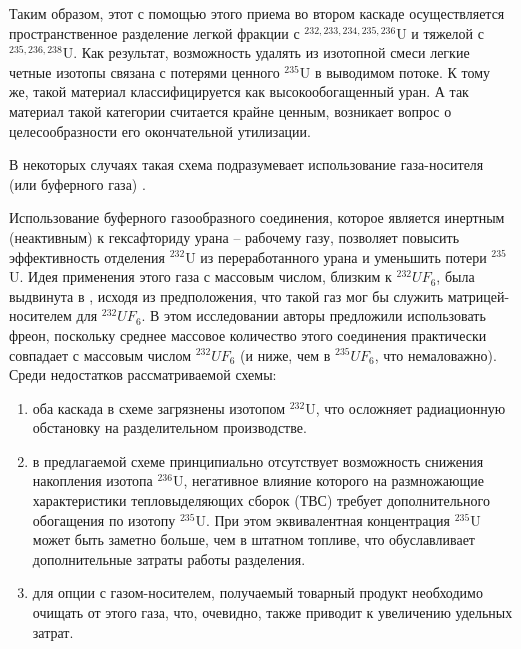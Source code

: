 Таким образом, этот с помощью этого приема во втором каскаде осуществляется пространственное разделение легкой фракции с $^{232,233,234,235,236}$U и тяжелой с $^{235,236,238}$U.
Как результат, возможность удалять из изотопной смеси легкие четные изотопы связана с потерями ценного $^{235}$U в выводимом потоке.
К тому же, такой материал классифицируется как высокообогащенный уран. А так материал такой категории считается крайне ценным, возникает вопрос о целесообразности его окончательной утилизации. 

В некоторых случаях такая схема подразумевает использование газа-носителя (или буферного газа) \cite{prusakovCorrectingIsotopicComposition2008, SposobIzotopnogoVosstanovleniyab}.


Использование буферного газообразного соединения, которое является инертным (неактивным) к гексафториду урана -- рабочему газу, позволяет повысить эффективность отделения $^{232}$U из переработанного урана и уменьшить потери $^{235}$U. Идея применения этого газа с массовым числом, близким к $^{232}UF_6$, была выдвинута в \cite{SosninYuChelcov}, исходя из предположения, что такой газ мог бы служить матрицей-носителем для $^{232}UF_6$. В этом исследовании авторы предложили использовать фреон, поскольку среднее массовое количество этого соединения практически совпадает с массовым числом $^{232}UF_6$ (и ниже, чем в $^{235}UF_6$, что немаловажно).
Среди недостатков рассматриваемой схемы:
\begin{enumerate}
  \item оба каскада в схеме загрязнены изотопом $^{232}$U, что осложняет радиационную обстановку на разделительном производстве.
  \item в предлагаемой схеме принципиально отсутствует возможность снижения накопления изотопа $^{236}$U, негативное влияние которого на размножающие характеристики тепловыделяющих сборок (ТВС) требует дополнительного обогащения по изотопу $^{235}$U. При этом эквивалентная концентрация $^{235}$U может быть заметно больше, чем в штатном топливе, что обуславливает дополнительные затраты работы разделения.
  \item для опции с газом-носителем, получаемый товарный продукт необходимо очищать от этого газа, что, очевидно, также приводит к увеличению удельных затрат.
\end{enumerate}

